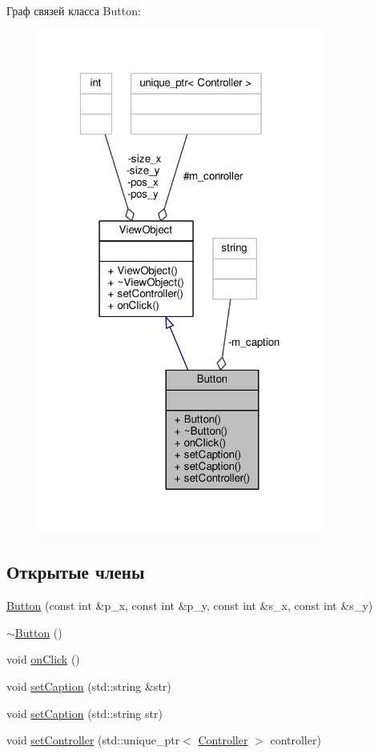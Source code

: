Граф связей класса Button\-:
\nopagebreak
\begin{figure}[H]
\begin{center}
\leavevmode
\includegraphics[width=267pt]{class_button__coll__graph}
\end{center}
\end{figure}
\subsection*{Открытые члены}
\begin{DoxyCompactItemize}
\item 
\hyperlink{class_button_ac637a36b28d13a66a0dbce532cec521b}{Button} (const int \&p\-\_\-x, const int \&p\-\_\-y, const int \&s\-\_\-x, const int \&s\-\_\-y)
\item 
\hyperlink{class_button_a2a001eb9c3cc8ae54768a850dd345002}{$\sim$\-Button} ()
\item 
void \hyperlink{class_button_ae0fef75f8dd8a25ae122a379ad330400}{on\-Click} ()
\item 
void \hyperlink{class_button_a95e15fb095da12867e001df39cef24c7}{set\-Caption} (std\-::string \&str)
\item 
void \hyperlink{class_button_ae33b92340f6cd5525c65998452b31260}{set\-Caption} (std\-::string str)
\item 
void \hyperlink{class_button_a2fbc0656e6a74d895365cb4f383b432e}{set\-Controller} (std\-::unique\-\_\-ptr$<$ \hyperlink{class_controller}{Controller} $>$ controller)
\end{DoxyCompactItemize}
